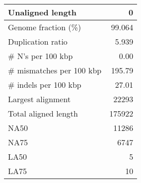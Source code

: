 \documentclass[12pt,a4paper]{article}
\begin{document}
\begin{table}[ht]
\begin{center}
\begin{tabular}{|l*{1}{|r}|}
Unaligned length & 0 \\ \hline
Genome fraction (\%) & 99.064 \\ \hline
Duplication ratio & 5.939 \\ \hline
\# N's per 100 kbp & 0.00 \\ \hline
\# mismatches per 100 kbp & 195.79 \\ \hline
\# indels per 100 kbp & 27.01 \\ \hline
Largest alignment & 22293 \\ \hline
Total aligned length & 175922 \\ \hline
NA50 & 11286 \\ \hline
NA75 & 6747 \\ \hline
LA50 & 5 \\ \hline
LA75 & 10 \\ \hline
\end{tabular}
\end{center}
\end{table}
\end{document}
